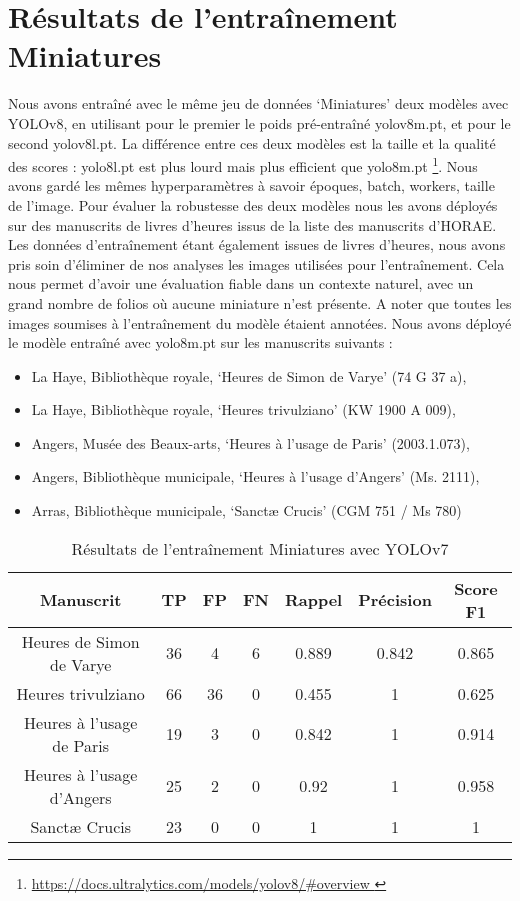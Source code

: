 \documentclass[12pt,twoside]{book}
\begin{document}
\section{Résultats de l'entraînement Miniatures}

Nous avons entraîné avec le même jeu de données ‘Miniatures’ deux modèles avec YOLOv8, en utilisant pour le premier le poids pré-entraîné yolov8m.pt, et pour le second yolov8l.pt. La différence entre ces deux modèles est la taille et la qualité des scores : yolo8l.pt est plus lourd mais plus efficient que yolo8m.pt \footnote{\url{  https://docs.ultralytics.com/models/yolov8/\#overview }}. Nous avons gardé les mêmes hyperparamètres à savoir époques, batch, workers, taille de l’image. Pour évaluer la robustesse des deux modèles nous les avons déployés sur des manuscrits de livres d’heures issus de la liste des manuscrits d’HORAE. Les données d’entraînement étant également issues de livres d’heures, nous avons pris soin d’éliminer de nos analyses les images utilisées pour l’entraînement. Cela nous permet d’avoir une évaluation fiable dans un contexte naturel, avec un grand nombre de folios où aucune miniature n’est présente. A noter que toutes les images soumises à l’entraînement du modèle étaient annotées. Nous avons déployé le modèle entraîné avec yolo8m.pt sur les manuscrits suivants :

\begin{itemize}
    \item La Haye, Bibliothèque royale, ‘Heures de Simon de Varye’ (74 G 37 a),
    \item La Haye, Bibliothèque royale, ‘Heures trivulziano’ (KW 1900 A 009),
    \item Angers, Musée des Beaux-arts, ‘Heures à l'usage de Paris’ (2003.1.073),
    \item Angers, Bibliothèque municipale, ‘Heures à l’usage d’Angers’ (Ms. 2111),
    \item Arras, Bibliothèque municipale, ‘Sanctæ Crucis’ (CGM 751 / Ms 780)
\end{itemize}


\begin{table}[ht]
    \centering
    \begin{tabular}{|c|c|c|c|c|c|c|}
    \hline
    \textbf{Manuscrit} & \textbf{TP} & \textbf{FP} & \textbf{FN} & \textbf{Rappel} & \textbf{Précision} & \textbf{Score F1} \\
    \hline
    Heures de Simon de Varye & 36 & 4 & 6 & 0.889 & 0.842 & 0.865 \\ 
    \hline
    Heures trivulziano & 66 & 36 & 0 & 0.455 & 1 & 0.625 \\ 
    \hline
    Heures à l'usage de Paris & 19 & 3 & 0 & 0.842 & 1 & 0.914 \\ 
    \hline
    Heures à l’usage d’Angers & 25 & 2 & 0 & 0.92 & 1 & 0.958 \\ 
    \hline
    Sanctæ Crucis & 23 & 0 & 0 & 1 & 1 & 1 \\ 
    \hline
    \end{tabular}
    \caption{Résultats de l'entraînement Miniatures avec YOLOv7}
\end{table}
\end{document}
